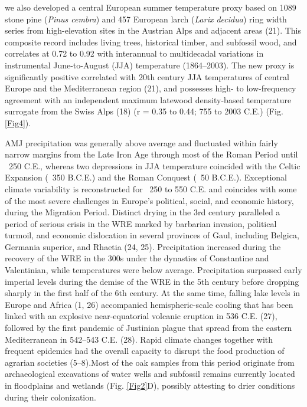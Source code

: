 \documentclass[10pt,a4paper,twoside,onecolumn]{article}
\begin{document}
\begin{myfont}
\begin{multicols}{3}
we also developed a central European summer temperature proxy based on 1089 stone pine (\textit{Pinus cembra}) and 457 European larch (\textit{Larix decidua}) ring width series from high-elevation sites in the Austrian Alps and adjacent areas (21). This composite record includes living trees, historical timber, and subfossil wood, and correlates at 0.72 to 0.92 with interannual to multidecadal variations in instrumental June-to-August (JJA) temperature (1864–2003). The new proxy is significantly positive correlated with 20th century JJA temperatures of central Europe and the Mediterranean region (21), and possesses high- to low-frequency agreement with an independent maximum latewood density-based temperature surrogate from the Swiss Alps (18) (r = 0.35 to 0.44; 755 to 2003 C.E.) (Fig. \ref{Fig4}). \par
AMJ precipitation was generally above average and fluctuated within fairly narrow margins from the Late Iron Age through most of the Roman Period until ~250 C.E., whereas two depressions in JJA temperature coincided with the Celtic Expansion (~350 B.C.E.) and the Roman Conquest (~50 B.C.E.). Exceptional climate variability is reconstructed for ~250 to 550 C.E. and coincides with some of the most severe challenges in Europe’s political, social, and economic history, during the Migration Period. Distinct drying in the 3rd century paralleled a period of serious crisis in the WRE marked by barbarian invasion, political turmoil, and economic dislocation in several provinces of Gaul, including Belgica, Germania superior, and Rhaetia (24, 25). Precipitation increased during the recovery of the WRE in the 300s under the dynasties of Constantine and Valentinian, while temperatures were below average. Precipitation surpassed early
imperial levels during the demise of the WRE in the 5th century before dropping sharply in the first half of the 6th century. At the same time, falling
lake levels in Europe and Africa (1, 26) accompanied hemispheric-scale cooling that has been linked with an explosive near-equatorial volcanic eruption in 536 C.E. (27), followed by the first pandemic of Justinian plague that spread from the eastern Mediterranean in 542–543 C.E. (28). Rapid climate changes together with frequent epidemics had the overall capacity to disrupt the food production of agrarian societies (5–8).Most of the oak samples from this period originate from archaeological excavations of water wells and subfossil remains currently located in floodplains and wetlands (Fig. \ref{Fig2}D), possibly attesting to drier
conditions during their colonization. \par

\end{multicols}
\end{myfont}
\end{document}

